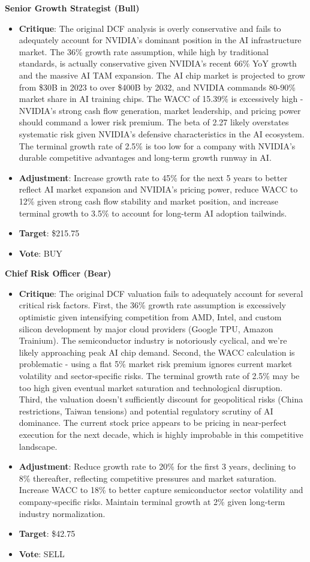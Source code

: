 \documentclass{article}
\begin{document}
\textbf{Senior Growth Strategist (Bull)}
\begin{itemize}
    \item \textbf{Critique}: The original DCF analysis is overly conservative and fails to adequately account for NVIDIA's dominant position in the AI infrastructure market. The 36\% growth rate assumption, while high by traditional standards, is actually conservative given NVIDIA's recent 66\% YoY growth and the massive AI TAM expansion. The AI chip market is projected to grow from \$30B in 2023 to over \$400B by 2032, and NVIDIA commands 80-90\% market share in AI training chips. The WACC of 15.39\% is excessively high - NVIDIA's strong cash flow generation, market leadership, and pricing power should command a lower risk premium. The beta of 2.27 likely overstates systematic risk given NVIDIA's defensive characteristics in the AI ecosystem. The terminal growth rate of 2.5\% is too low for a company with NVIDIA's durable competitive advantages and long-term growth runway in AI.
    \item \textbf{Adjustment}: Increase growth rate to 45\% for the next 5 years to better reflect AI market expansion and NVIDIA's pricing power, reduce WACC to 12\% given strong cash flow stability and market position, and increase terminal growth to 3.5\% to account for long-term AI adoption tailwinds.
    \item \textbf{Target}: \$215.75
    \item \textbf{Vote}: BUY
\end{itemize}

\textbf{Chief Risk Officer (Bear)}
\begin{itemize}
    \item \textbf{Critique}: The original DCF valuation fails to adequately account for several critical risk factors. First, the 36\% growth rate assumption is excessively optimistic given intensifying competition from AMD, Intel, and custom silicon development by major cloud providers (Google TPU, Amazon Trainium). The semiconductor industry is notoriously cyclical, and we're likely approaching peak AI chip demand. Second, the WACC calculation is problematic - using a flat 5\% market risk premium ignores current market volatility and sector-specific risks. The terminal growth rate of 2.5\% may be too high given eventual market saturation and technological disruption. Third, the valuation doesn't sufficiently discount for geopolitical risks (China restrictions, Taiwan tensions) and potential regulatory scrutiny of AI dominance. The current stock price appears to be pricing in near-perfect execution for the next decade, which is highly improbable in this competitive landscape.
    \item \textbf{Adjustment}: Reduce growth rate to 20\% for the first 3 years, declining to 8\% thereafter, reflecting competitive pressures and market saturation. Increase WACC to 18\% to better capture semiconductor sector volatility and company-specific risks. Maintain terminal growth at 2\% given long-term industry normalization.
    \item \textbf{Target}: \$42.75
    \item \textbf{Vote}: SELL
\end{itemize}
\end{document}
